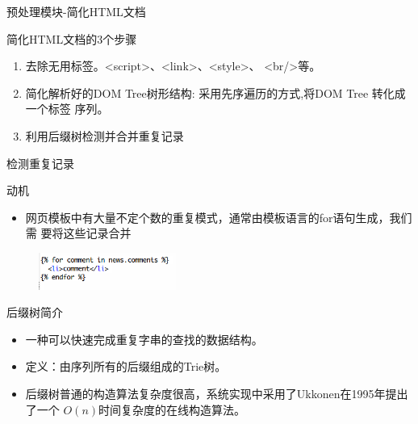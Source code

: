 \begin{frame}[t,label=sec-2-4]{预处理模块-简化HTML文档}
  \begin{block}{简化HTML文档的3个步骤}
\begin{enumerate}
\item 去除无用标签。<script>、<link>、<style>、 <br/>等。
\item<2-> 简化解析好的DOM Tree树形结构: 采用先序遍历的方式,将DOM Tree 转化成一个标签
  序列。
  \vspace{-1cm}
\item<4-> \alert<5>{利用后缀树检测并合并重复记录}
\end{enumerate}
\end{block}
\end{frame}

\begin{frame}[label=sec-2-6]{检测重复记录}
  \begin{block}{动机}
    \begin{itemize}
    \item 网页模板中有大量不定个数的重复模式，通常由模板语言的for语句生成，我们需
      要将这些记录合并
    \end{itemize}    
    \begin{figure}[h]
      \centering
      \includegraphics[width=0.4\textwidth]{django-for}
    \end{figure}
  \end{block}
  \pause
  \begin{block}{后缀树简介}
\begin{itemize}
\item 一种可以快速完成重复字串的查找的数据结构。
\item 定义：由序列所有的后缀组成的Trie树。
\item 后缀树普通的构造算法复杂度很高，系统实现中采用了Ukkonen在1995年提出了一个
  \(O(n)\)时间复杂度的在线构造算法。
\end{itemize}
  \end{block}
\end{frame}

